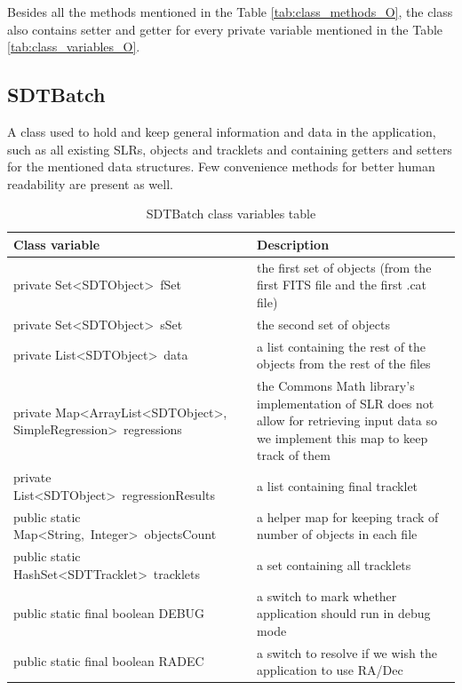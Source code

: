 	Besides all the methods mentioned in the Table \ref{tab:class_methods_O}, the class also contains setter and getter for every private variable mentioned in the Table \ref{tab:class_variables_O}.
	
\newpage

\subsection{SDTBatch}\label{subsec:batch}

	A class used to hold and keep general information and data in the application, such as all existing SLRs, objects and tracklets and containing getters and setters for the mentioned data structures. Few convenience methods for better human readability are present as well.
	
\begin{table}[H]
\centering
\setlength{\extrarowheight}{2pt}
\begin{tabularx}{\textwidth}{|X|X|}
\hline
\textbf{Class variable} & \textbf{Description} \\ \hline
private \mbox{Set<SDTObject> fSet} & the first set of objects (from the first FITS file and the first .cat file) \\ \hline
private \mbox{Set<SDTObject> sSet} & the second set of objects \\ \hline
private \mbox{List<SDTObject> data} & a list containing the rest of the objects from the rest of the files \\ \hline
private \mbox{Map<ArrayList<SDTObject>,} \mbox{SimpleRegression> regressions} & the Commons Math library's implementation of SLR does not allow for retrieving input data so we implement this map to keep track of them \\ \hline
private \mbox{List<SDTObject> regressionResults} & a list containing final tracklet \\ \hline
public static \mbox{Map<String, Integer> objectsCount} & a helper map for keeping track of number of objects in each file \\ \hline
public static \mbox{HashSet<SDTTracklet> tracklets} & a set containing all tracklets \\ \hline
public static final boolean \mbox{DEBUG} & a switch to mark whether application should run in debug mode \\ \hline
public static final boolean \mbox{RADEC} & a switch to resolve if we wish the application to use RA/Dec \\ \hline
\end{tabularx}
\caption{SDTBatch class variables table}
\label{tab:class_variables_B}
\end{table}


